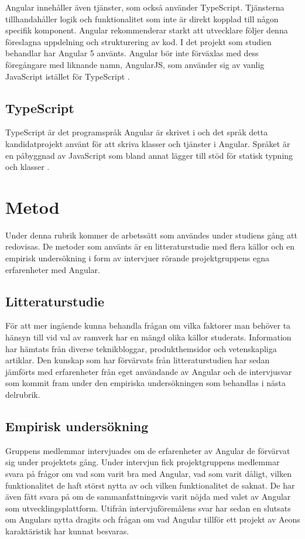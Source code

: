 Angular innehåller även tjänster, som också använder TypeScript. Tjänsterna tillhandahåller logik och funktionalitet som inte är direkt kopplad till någon specifik komponent. Angular rekommenderar starkt att utvecklare följer denna föreslagna uppdelning och strukturering av kod. I det projekt som studien behandlar har Angular 5 använts. Angular bör inte förväxlas med dess föregångare med liknande namn, AngularJS, som använder sig av vanlig JavaScript istället för TypeScript \cite{angularguide}.


\subsection{TypeScript}

TypeScript är det programspråk Angular är skrivet i och det språk detta kandidatprojekt använt för att skriva klasser och tjänster i Angular. Språket är en påbyggnad av JavaScript som bland annat lägger till stöd för statisk typning och klasser \cite{henrik_ts1}.


\section{Metod}

Under denna rubrik kommer de arbetssätt som användes under studiens gång att redovisas. De metoder som använts är en litteraturstudie med flera källor och en empirisk undersökning i form av intervjuer rörande projektgruppens egna erfarenheter med Angular.

\subsection{Litteraturstudie}

För att mer ingående kunna behandla frågan om vilka faktorer man behöver ta hänsyn till vid val av ramverk har en mängd olika källor studerats. Information har hämtats från diverse teknikbloggar, produkthemsidor och vetenskapliga artiklar. Den kunskap som har förvärvats från litteraturstudien har sedan jämförts med erfarenheter från eget användande av Angular och de intervjusvar som kommit fram under den empiriska undersökningen som behandlas i nästa delrubrik.

\subsection{Empirisk undersökning} 

Gruppens medlemmar intervjuades om de erfarenheter av Angular de förvärvat sig under projektets gång. Under intervjun fick projektgruppens medlemmar svara på frågor om vad som varit bra med Angular, vad som varit dåligt, vilken funktionalitet de haft störst nytta av och vilken funktionalitet de saknat. De har även fått svara på om de sammanfattningsvis varit nöjda med valet av Angular som utvecklingsplattform. Utifrån intervjuföremålens svar har sedan en slutsats om Angulars nytta dragits och frågan om vad Angular tillför ett projekt av Aeons karaktäristik har kunnat besvaras.

